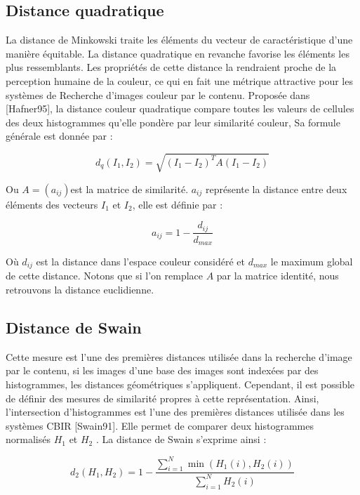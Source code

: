 \subsection{Distance quadratique}
La distance de Minkowski traite les éléments du vecteur de caractéristique d’une manière équitable. La distance quadratique en revanche favorise les éléments les plus ressemblants. Les propriétés de cette distance la rendraient proche de la perception humaine de la couleur, ce qui en fait une métrique attractive pour les systèmes de Recherche d’images couleur par le contenu. Proposée dans [Hafner95], la distance couleur quadratique compare toutes les valeurs
de cellules des deux histogrammes qu’elle pondère par leur similarité couleur, Sa formule générale est donnée par :

	\begin{equation}
	d_q(I_1, I_2) = \sqrt{(I_1 - I_2)^T A (I_1 - I_2)} 
	\end{equation}



Ou $A = (a_{ij}) $est la matrice de similarité. $a_{ij}$ représente la distance entre deux éléments des vecteurs $I_1$ et $I_2$, elle est définie par :


\begin{equation}
	a_{ij} = 1 - \frac{d_{ij}}{ d_{max}} 
\end{equation}

Où $ d_{ij} $ est la distance dans l’espace couleur considéré et $ d_{max} $ le maximum global
de cette distance. Notons que si l’on remplace $  A $ par la matrice identité, nous retrouvons la distance euclidienne.
\subsection{Distance de Swain}
Cette mesure est l'une des premières distances utilisée dans la recherche d'image par le contenu, si les images d’une base des images sont indexées par des histogrammes, les distances géométriques s’appliquent. Cependant, il est possible de définir des mesures de similarité propres à cette représentation. Ainsi, l’intersection d’histogrammes est l’une des premières distances utilisée dans les systèmes CBIR [Swain91]. Elle permet de comparer deux histogrammes normalisés $H_1$ et $H_2$ . La distance de Swain s’exprime ainsi :

	\begin{equation}
	 d_2(H_1, H_2) = 1- \frac{\sum_{i=1}^{N} \min(H_1(i),  H_2(i))}{\sum_{i=1}^{N}  H_2(i)}  
	\end{equation}

